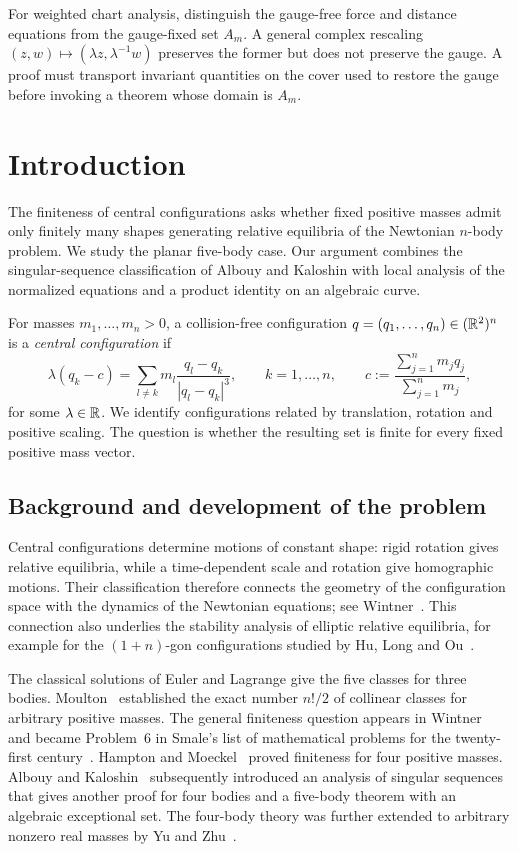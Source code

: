 \documentclass[Threeside,11pt]{article}
\theoremstyle{definition}
\theoremstyle{remark}
\numberwithin{equation}{section}
\theoremstyle{remark}
\begin{document}
For weighted chart analysis, distinguish the gauge-free force and distance
equations from the gauge-fixed set $A_m$. A general complex rescaling
$(z,w)\mapsto(\lambda z,\lambda^{-1}w)$ preserves the former but does not
preserve the gauge. A proof must transport invariant quantities on the cover
used to restore the gauge before invoking a theorem whose domain is $A_m$.



\section{Introduction}\label{sec:intro}

The finiteness of central configurations asks whether fixed positive masses admit
only finitely many shapes generating relative equilibria of the Newtonian
$n$-body problem. We study the planar five-body case. Our argument combines the
singular-sequence classification of Albouy and Kaloshin with local analysis of
the normalized equations and a product identity on an algebraic curve.

For masses $m_1,\dots,m_n>0$, a collision-free configuration
$q=(q_1,\dots,q_n)\in(\mathbb R^2)^n$ is a \emph{central configuration} if
\[
 \lambda(q_k-c)=\sum_{l\ne k}m_l\frac{q_l-q_k}{|q_l-q_k|^3},
 \qquad k=1,\dots,n,\qquad
 c:=\frac{\sum_{j=1}^n m_jq_j}{\sum_{j=1}^n m_j},
\]
for some $\lambda\in\mathbb R$. We identify configurations related by translation,
rotation and positive scaling. The question is whether the resulting set is
finite for every fixed positive mass vector.

\subsection*{Background and development of the problem}
Central configurations determine motions of constant shape: rigid rotation
gives relative equilibria, while a time-dependent scale and rotation give
homographic motions. Their classification therefore connects the geometry of
the configuration space with the dynamics of the Newtonian equations; see
Wintner~\cite{Wintner}. This connection also underlies the stability analysis of
elliptic relative equilibria, for example for the $(1+n)$-gon configurations
studied by Hu, Long and Ou~\cite{HLO20}.

The classical solutions of Euler and Lagrange give the five classes for three
bodies. Moulton~\cite{Moulton} established the exact number $n!/2$ of collinear
classes for arbitrary positive masses. The general finiteness question appears
in Wintner~\cite{Wintner} and became Problem~6 in Smale's list of mathematical
problems for the twenty-first century~\cite{Smale}. Hampton and
Moeckel~\cite{HM} proved finiteness for four positive masses. Albouy and
Kaloshin~\cite{AK} subsequently introduced an analysis of singular sequences
that gives another proof for four bodies and a five-body theorem with an
algebraic exceptional set. The four-body theory was further extended to
arbitrary nonzero real masses by Yu and Zhu~\cite{YZ}.
\end{document}
